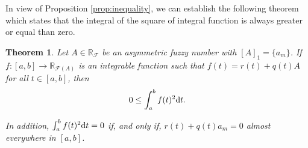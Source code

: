 \documentclass[12pt,a4paper]{article}
\newcommand{\RF}{\mathbb{R}_\mathcal{F}}
\newcommand{\RFA}{\mathbb{R}_{\mathcal{F}(A)}}
\newtheorem{theorem}{Theorem}
\begin{document}
In view of Proposition \ref{prop:inequality}, we can establish the following theorem which states that the integral of the square of integral function is always greater or equal than zero. 

\begin{theorem}\label{thm:integral_square}
Let $A \in \RF$ be an asymmetric fuzzy number with $[A]_1 = \{a_m\}$. 
If $f:[a,b]\to \RFA$ is an integrable function such that $f(t) = r(t) + q(t)A$ for all $t \in [a,b]$, then
\begin{equation}
0 \leq \int_a^b f(t)^2 \textnormal{d}t.    
\end{equation}

In addition, $\int_a^b f(t)^2 \textnormal{d}t = 0$ if, and only if, $r(t) + q(t)a_m = 0$ almost everywhere in $[a,b]$. %
\end{theorem}
\end{document}
